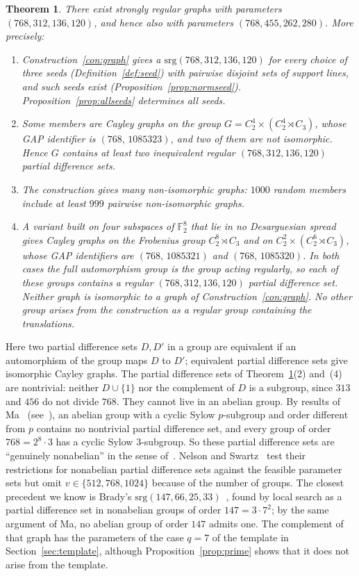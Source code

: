 \documentclass[11pt]{amsart}
\newtheorem{theorem}{Theorem}[section]
\theoremstyle{definition}
\newcommand{\F}{\mathbb{F}}
\newcommand{\srg}{\mathrm{srg}}
\begin{document}
\begin{theorem}\label{thm:main}
There exist strongly regular graphs with parameters $(768,312,136,120)$, and hence also with parameters $(768,455,262,280)$. More precisely:
\begin{enumerate}
\item Construction~\ref{con:graph} gives a $\srg(768,312,136,120)$ for every choice of three seeds (Definition~\ref{def:seed}) with pairwise disjoint sets of support lines, and such seeds exist (Proposition~\ref{prop:normseed}). Proposition~\ref{prop:allseeds} determines all seeds.
\item Some members are Cayley graphs on the group $G=C_2^4\times(C_2^4\rtimes C_3)$, whose GAP identifier is $(768,\,1085323)$, and two of them are not isomorphic. Hence $G$ contains at least two inequivalent regular $(768,312,136,120)$ partial difference sets.
\item The construction gives many non-isomorphic graphs: $1000$ random members include at least $999$ pairwise non-isomorphic graphs.
\item A variant built on four subspaces of $\F_2^8$ that lie in no Desarguesian spread gives Cayley graphs on the Frobenius group $C_2^8\rtimes C_3$ and on $C_2^2\times(C_2^6\rtimes C_3)$, whose GAP identifiers are $(768,\,1085321)$ and $(768,\,1085320)$. In both cases the full automorphism group is the group acting regularly, so each of these groups contains a regular $(768,312,136,120)$ partial difference set. Neither graph is isomorphic to a graph of Construction~\ref{con:graph}. No other group arises from the construction as a regular group containing the translations.
\end{enumerate}
\end{theorem}

Here two partial difference sets $D,D'$ in a group are equivalent if an automorphism of the group maps $D$ to $D'$; equivalent partial difference sets give isomorphic Cayley graphs. The partial difference sets of Theorem~\ref{thm:main}(2) and~(4) are nontrivial: neither $D\cup\{1\}$ nor the complement of $D$ is a subgroup, since $313$ and $456$ do not divide $768$. They cannot live in an abelian group. By results of Ma~\cite{Ma1994,Ma1997} (see~\cite[Prop.~1]{DeWinterWang}), an abelian group with a cyclic Sylow $p$-subgroup and order different from $p$ contains no nontrivial partial difference set, and every group of order $768=2^8\cdot3$ has a cyclic Sylow $3$-subgroup. So these partial difference sets are ``genuinely nonabelian'' in the sense of~\cite{DPSS2023,PDSS2024}. Nelson and Swartz~\cite{NelsonSwartz} test their restrictions for nonabelian partial difference sets against the feasible parameter sets but omit $v\in\{512,768,1024\}$ because of the number of groups. The closest precedent we know is Brady's $\srg(147,66,25,33)$~\cite{Brady2025}, found by local search as a partial difference set in nonabelian groups of order $147=3\cdot7^2$; by the same argument of Ma, no abelian group of order $147$ admits one. The complement of that graph has the parameters of the case $q=7$ of the template in Section~\ref{sec:template}, although Proposition~\ref{prop:prime} shows that it does not arise from the template.
\end{document}
